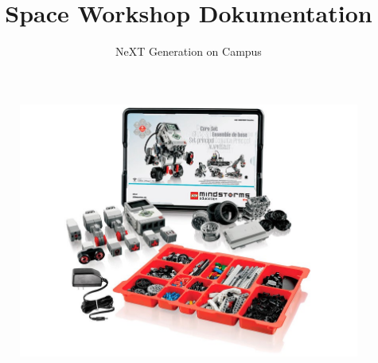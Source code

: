 \documentclass[12pt,colorbacktitle,accentcolor=tud1c]{tudexercise}
\title{Space Workshop \newline Dokumentation }
\subtitle{NeXT Generation on Campus}
\begin{document}
	\maketitle	
	\bigskip
	\bigskip
	\bigskip
	\bigskip
	\bigskip
	\bigskip
	\begin{figure}[h]
			\centering 
			\includegraphics[width=\textwidth]{images/title.jpg}
	\end{figure}
	
	\newpage
	
			
	
	
	
	
	
		{}
		{}
	
	
  
   
    
\end{document}
